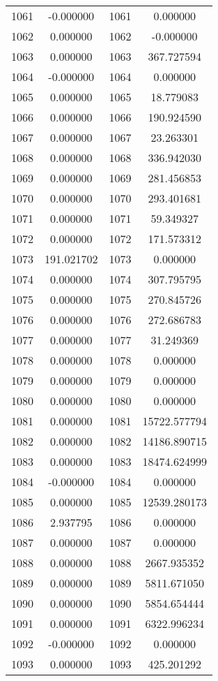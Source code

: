 \documentclass[12pt]{article}
\begin{document}
\begin{longtable}{@{}cccc@{}}
1061 & -0.000000 & 1061 & 0.000000 \\
1062 & 0.000000 & 1062 & -0.000000 \\
1063 & 0.000000 & 1063 & 367.727594 \\
1064 & -0.000000 & 1064 & 0.000000 \\
1065 & 0.000000 & 1065 & 18.779083 \\
1066 & 0.000000 & 1066 & 190.924590 \\
1067 & 0.000000 & 1067 & 23.263301 \\
1068 & 0.000000 & 1068 & 336.942030 \\
1069 & 0.000000 & 1069 & 281.456853 \\
1070 & 0.000000 & 1070 & 293.401681 \\
1071 & 0.000000 & 1071 & 59.349327 \\
1072 & 0.000000 & 1072 & 171.573312 \\
1073 & 191.021702 & 1073 & 0.000000 \\
1074 & 0.000000 & 1074 & 307.795795 \\
1075 & 0.000000 & 1075 & 270.845726 \\
1076 & 0.000000 & 1076 & 272.686783 \\
1077 & 0.000000 & 1077 & 31.249369 \\
1078 & 0.000000 & 1078 & 0.000000 \\
1079 & 0.000000 & 1079 & 0.000000 \\
1080 & 0.000000 & 1080 & 0.000000 \\
1081 & 0.000000 & 1081 & 15722.577794 \\
1082 & 0.000000 & 1082 & 14186.890715 \\
1083 & 0.000000 & 1083 & 18474.624999 \\
1084 & -0.000000 & 1084 & 0.000000 \\
1085 & 0.000000 & 1085 & 12539.280173 \\
1086 & 2.937795 & 1086 & 0.000000 \\
1087 & 0.000000 & 1087 & 0.000000 \\
1088 & 0.000000 & 1088 & 2667.935352 \\
1089 & 0.000000 & 1089 & 5811.671050 \\
1090 & 0.000000 & 1090 & 5854.654444 \\
1091 & 0.000000 & 1091 & 6322.996234 \\
1092 & -0.000000 & 1092 & 0.000000 \\
1093 & 0.000000 & 1093 & 425.201292 \\

\end{longtable}
\end{document}
